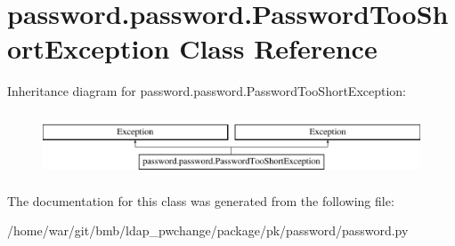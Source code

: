 \hypertarget{classpassword_1_1password_1_1PasswordTooShortException}{\section{password.\-password.\-Password\-Too\-Short\-Exception Class Reference}
\label{classpassword_1_1password_1_1PasswordTooShortException}
}
Inheritance diagram for password.\-password.\-Password\-Too\-Short\-Exception\-:\begin{figure}[H]
\begin{center}
\leavevmode
\includegraphics[height=1.885522cm]{classpassword_1_1password_1_1PasswordTooShortException}
\end{center}
\end{figure}


The documentation for this class was generated from the following file\-:\begin{DoxyCompactItemize}
\item 
/home/war/git/bmb/ldap\-\_\-pwchange/package/pk/password/password.\-py\end{DoxyCompactItemize}
